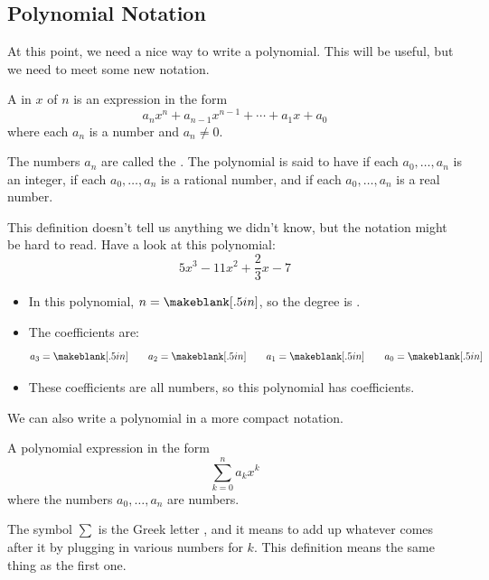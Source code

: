 \subsection{Polynomial Notation}
At this point, we need a nice way to write a polynomial. This will be useful, but we need to meet some new notation.
\begin{definition}[Polynomial]
A  in  $x$ of  $n$ is an expression in the form
\[
a_n x^n + a_{n-1} x^{n-1} + \cdots + a_1 x + a_0
\]
where each $a_n$ is a number and $a_n\neq 0$.

The numbers $a_n$ are called the . The polynomial is said to have  if each $a_0,\dots,a_n$ is an integer,  if each $a_0,\dots,a_n$ is a rational number, and  if each $a_0,\dots,a_n$ is a real number.
\end{definition}
This definition doesn't tell us anything we didn't know, but the notation might be hard to read. Have a look at this polynomial:
\[
5x^3-11x^2+\frac{2}{3}x-7
\]
\begin{itemize}
\item In this polynomial, $n=\makeblank[.5in]$, so the degree is \makeblank[.5in].
\item The coefficients are:
\[
a_3=\makeblank[.5in]\qquad
a_2=\makeblank[.5in]\qquad
a_1=\makeblank[.5in]\qquad
a_0=\makeblank[.5in]
\]
\item These coefficients are all \makeblank[1.5in] numbers, so this polynomial has \makeblank[1.5in] coefficients.
\end{itemize}
We can also write a polynomial in a more compact notation.
\begin{definition}[Polynomial]
A polynomial expression in the form
\[
\sum_{k=0}^n {a_k x^k}
\]
where the numbers $a_0,\dots,a_n$ are numbers.
\end{definition}
The symbol $\sum{}$ is the Greek letter \makeblank, and it means to add up whatever comes after it by plugging in various numbers for $k$. This definition means the same thing as the first one.